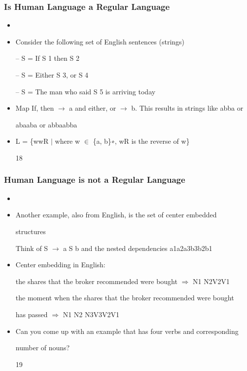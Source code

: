 \documentclass[compress,color=usenames]{beamer}
\begin{document}
\begin{frame}
\frametitle{Is Human Language a Regular Language}

\begin{itemize}
\item




\item Consider the following set of English sentences (strings)


-- S = If S 1 then S 2


-- S = Either S 3, or S 4


-- S = The man who said S 5 is arriving today





\item Map If, then $\rightarrow$ a and either, or $\rightarrow$ b. This results in strings like abba or


abaaba or abbaabba


\item L = \{wwR $\mid$ where w $\in$ \{a, b\}∗, wR is the reverse of w\}


18




\end{itemize}

\end{frame}

\begin{frame}
\frametitle{Human Language is not a Regular Language}

\begin{itemize}
\item




\item Another example, also from English, is the set of center embedded


structures


Think of S $\rightarrow$ a S b and the nested dependencies a1a2a3b3b2b1





\item Center embedding in English:


the shares that the broker recommended were bought $\Rightarrow$ N1 N2V2V1


the moment when the shares that the broker recommended were bought


has passed $\Rightarrow$ N1 N2 N3V3V2V1





\item Can you come up with an example that has four verbs and corresponding


number of nouns?


19




\end{itemize}

\end{frame}
\end{document}
